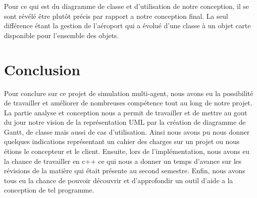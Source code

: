 \documentclass[12pt,french]{article} %
\begin{document}
 
 Pour ce qui est du diagramme de classe et d'utilisation de notre conception, il se sont révélé être plutôt précis par rapport a notre conception final. La seul différence étant la gestion de l'aéroport qui a évolué d'une classe à un objet carte disponible pour l'ensemble des objets.

\section{Conclusion}

Pour conclure sur ce projet de simulation multi-agent, nous avons eu la possibilité de travailler et améliorer de nombreuses compétence tout au long de notre projet. La partie analyse et conception nous a permit de travailler et de mettre au gout du jour notre vision de la représentation UML par la création de diagramme de Gantt, de classe mais aussi de cas d'utilisation. Ainsi nous avons pu nous donner quelques indications représentant un cahier des charges sur un projet ou nous étions le concepteur et le client. Ensuite, lors de l'implémentation, nous avons eu la chance de travailler en c++ ce qui nous a donner un temps d'avance sur les révisions de la matière qui était présente au second semestre. Enfin, nous avons tous eu la chance de pouvoir découvrir et  d'approfondir un outil d'aide a la conception de tel programme.   

\listoffigures
\end{document}

